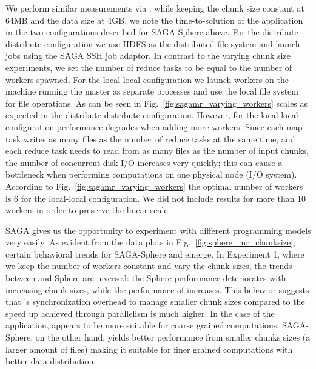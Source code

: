\documentclass[graybox]{svmult}
\begin{document}
We perform similar measurements via \sagamapreduce: while keeping the
chunk size constant at 64MB and the data size at 4GB, we note the
time-to-solution of the \wc application in the two configurations
described for SAGA-Sphere above.  For the distribute-distribute
configuration we use HDFS as the distributed file system and launch
jobs using the SAGA SSH job adaptor.  In contrast to the varying chunk
size experiments, we set the number of reduce tasks to be equal to the
number of workers spawned.   For the local-local configuration we launch
workers on the machine running the master as separate processes and
use the local file system for file operations.  As can be seen in
Fig.~\ref{fig:sagamr_varying_workers} \sagamapreduce scales as
expected in the distribute-distribute configuration.  However, for the
local-local configuration performance degrades when adding more
workers.  Since each map task writes as many files as the number of
reduce tasks at the same time, and each reduce task needs to read from
as many files as the number of input chunks, the number of concurrent
disk I/O increases very quickly; this can cause a
bottleneck when performing computations on one physical node (I/O
system).  According to Fig.~\ref{fig:sagamr_varying_workers} the
optimal number of workers is 6 for the local-local configuration.  We
did not include results for more than 10 workers in order to preserve
the linear
scale. %

SAGA gives us the opportunity to experiment with different programming
models very easily.  As evident from the data plots in
Fig.~\ref{fig:sphere_mr_chunksize}, certain behavioral trends for
SAGA-Sphere and \sagamapreduce emerge.  In Experiment 1, where we keep
the number of workers constant and vary the chunk sizes, the trends
between \sagamapreduce and Sphere are inversed: the Sphere performance
deteriorates with increasing chunk sizes, while the performance of
\sagamapreduce increases. This behavior suggests that \sagamapreduce's
synchronization overhead to manage smaller chunk sizes compared to the
speed up achieved through parallelism is much higher.  In the case of
the \wc application, \sagamapreduce appears to be more suitable for
coarse grained computations. SAGA-Sphere, on the other hand, yields
better performance from smaller chunks sizes (a larger amount of
files) making it suitable for finer grained computations with better
data distribution.
\end{document}

